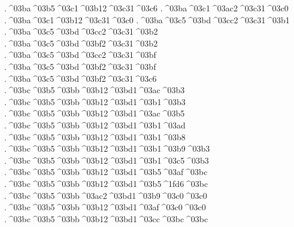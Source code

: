 {.^^^^03ba^^^^03b5^^^^03c1^^^^03b12^^^^03c31^^^^03c6 		%
.^^^^03ba^^^^03c1^^^^03ac2^^^^03c31^^^^03c0 		%
.^^^^03ba^^^^03c1^^^^03b12^^^^03c31^^^^03c0
.^^^^03ba^^^^03c5^^^^03bd^^^^03cc2^^^^03c31^^^^03b1 		%
.^^^^03ba^^^^03c5^^^^03bd^^^^03cc2^^^^03c31^^^^03b2 		%
.^^^^03ba^^^^03c5^^^^03bd^^^^03bf2^^^^03c31^^^^03b2
.^^^^03ba^^^^03c5^^^^03bd^^^^03cc2^^^^03c31^^^^03bf 		%
.^^^^03ba^^^^03c5^^^^03bd^^^^03bf2^^^^03c31^^^^03bf
.^^^^03ba^^^^03c5^^^^03bd^^^^03bf2^^^^03c31^^^^03c6  		%
.^^^^03bc^^^^03b5^^^^03bb^^^^03b12^^^^03bd1^^^^03ac^^^^03b3			%
.^^^^03bc^^^^03b5^^^^03bb^^^^03b12^^^^03bd1^^^^03b1^^^^03b3
.^^^^03bc^^^^03b5^^^^03bb^^^^03b12^^^^03bd1^^^^03ac^^^^03b5			%
.^^^^03bc^^^^03b5^^^^03bb^^^^03b12^^^^03bd1^^^^03b1^^^^03ad
.^^^^03bc^^^^03b5^^^^03bb^^^^03b12^^^^03bd1^^^^03b1^^^^03b8			%
.^^^^03bc^^^^03b5^^^^03bb^^^^03b12^^^^03bd1^^^^03b1^^^^03b9^^^^03b3 		%
.^^^^03bc^^^^03b5^^^^03bb^^^^03b12^^^^03bd1^^^^03b1^^^^03c5^^^^03b3 		%
.^^^^03bc^^^^03b5^^^^03bb^^^^03b12^^^^03bd1^^^^03b5^^^^03af^^^^03bc 		%
.^^^^03bc^^^^03b5^^^^03bb^^^^03b12^^^^03bd1^^^^03b5^^^^1fd6^^^^03bc 		%
.^^^^03bc^^^^03b5^^^^03bb^^^^03ac2^^^^03bd1^^^^03b9^^^^03c0^^^^03c0 		%
.^^^^03bc^^^^03b5^^^^03bb^^^^03b12^^^^03bd1^^^^03af^^^^03c0^^^^03c0
.^^^^03bc^^^^03b5^^^^03bb^^^^03b12^^^^03bd1^^^^03cc^^^^03bc^^^^03bc 		%
}

